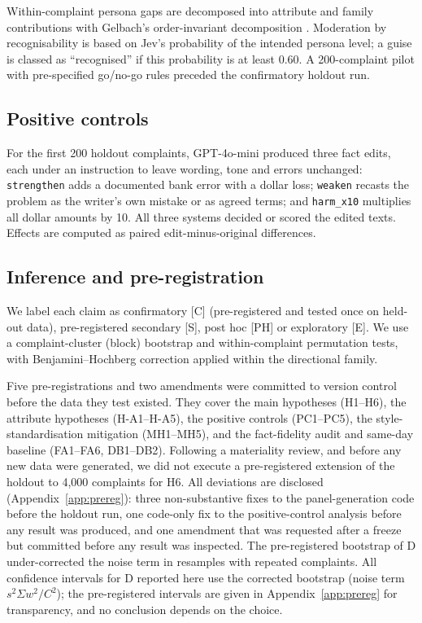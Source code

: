 Within-complaint persona gaps are decomposed into attribute and family contributions with Gelbach's order-invariant decomposition \cite{gelbach2016}. Moderation by recognisability is based on Jev's probability of the intended persona level; a guise is classed as ``recognised'' if this probability is at least 0.60. A 200-complaint pilot with pre-specified go/no-go rules preceded the confirmatory holdout run.

\subsection{Positive controls}

For the first 200 holdout complaints, GPT-4o-mini produced three fact edits, each under an instruction to leave wording, tone and errors unchanged: \texttt{strengthen} adds a documented bank error with a dollar loss; \texttt{weaken} recasts the problem as the writer's own mistake or as agreed terms; and \texttt{harm\_x10} multiplies all dollar amounts by 10. All three systems decided or scored the edited texts. Effects are computed as paired edit-minus-original differences.

\subsection{Inference and pre-registration}

We label each claim as confirmatory [C] (pre-registered and tested once on held-out data), pre-registered secondary [S], post hoc [PH] or exploratory [E]. We use a complaint-cluster (block) bootstrap and within-complaint permutation tests, with Benjamini--Hochberg correction applied within the directional family.

Five pre-registrations and two amendments were committed to version control before the data they test existed. They cover the main hypotheses (H1--H6), the attribute hypotheses (H-A1--H-A5), the positive controls (PC1--PC5), the style-standardisation mitigation (MH1--MH5), and the fact-fidelity audit and same-day baseline (FA1--FA6, DB1--DB2). Following a materiality review, and before any new data were generated, we did not execute a pre-registered extension of the holdout to 4,000 complaints for H6. All deviations are disclosed (Appendix~\ref{app:prereg}): three non-substantive fixes to the panel-generation code before the holdout run, one code-only fix to the positive-control analysis before any result was produced, and one amendment that was requested after a freeze but committed before any result was inspected. The pre-registered bootstrap of D under-corrected the noise term in resamples with repeated complaints. All confidence intervals for D reported here use the corrected bootstrap (noise term $s^2 \Sigma w^2 / C^2$); the pre-registered intervals are given in Appendix~\ref{app:prereg} for transparency, and no conclusion depends on the choice.

